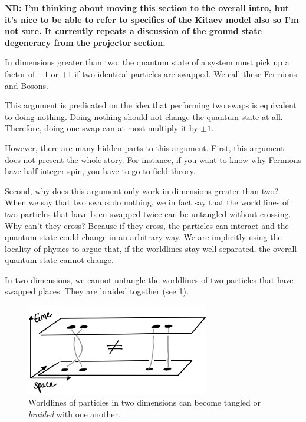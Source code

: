 \textbf{NB: I'm thinking about moving this section to the overall intro, but it's nice to be able to refer to specifics of the Kitaev model also so I'm not sure. It currently repeats a discussion of the ground state degeneracy from the projector section.}

In dimensions greater than two, the quantum state of a system must pick up a factor of \(-1\) or \(+1\) if two identical particles are swapped. We call these Fermions and Bosons.

This argument is predicated on the idea that performing two swaps is equivalent to doing nothing. Doing nothing should not change the quantum state at all. Therefore, doing one swap can at most multiply it by \(\pm 1\).

However, there are many hidden parts to this argument. First, this argument does not present the whole story. For instance, if you want to know why Fermions have half integer spin, you have to go to field theory.

Second, why does this argument only work in dimensions greater than two? When we say that two swaps do nothing, we in fact say that the world lines of two particles that have been swapped twice can be untangled without crossing. Why can't they cross? Because if they cross, the particles can interact and the quantum state could change in an arbitrary way. We are implicitly using the locality of physics to argue that, if the worldlines stay well separated, the overall quantum state cannot change.

In two dimensions, we cannot untangle the worldlines of two particles that have swapped places. They are braided together (see \cref{fig:braiding}).

\begin{figure}
\hypertarget{fig:braiding}{%
\centering
\includegraphics[width=0.71\textwidth,height=\textheight]{figure_code/amk_chapter/braiding.png}
\caption[Braiding in Two Dimensions]{Worldlines of particles in two dimensions can become tangled or
\emph{braided} with one another.}\label{fig:braiding}
}
\end{figure}

